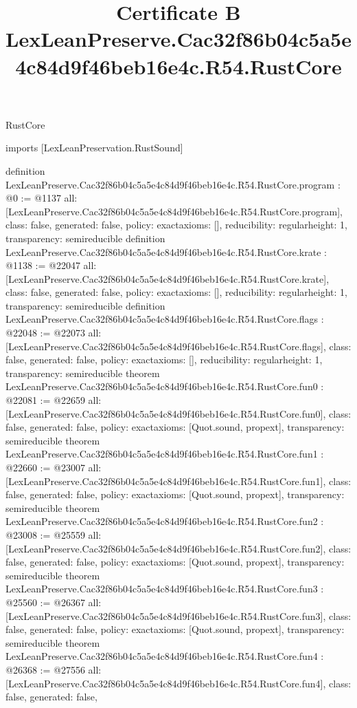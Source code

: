 \begin{lexlean}{RustCore}
\title{Certificate B LexLeanPreserve.Cac32f86b04c5a5e4c84d9f46beb16e4c.R54.RustCore}
\begin{coremodule}
imports [LexLeanPreservation.RustSound]

definition LexLeanPreserve.Cac32f86b04c5a5e4c84d9f46beb16e4c.R54.RustCore.program : @0 := @1137 {
  all: [LexLeanPreserve.Cac32f86b04c5a5e4c84d9f46beb16e4c.R54.RustCore.program],
  class: false,
  generated: false,
  policy: exact{axioms: []},
  reducibility: regular{height: 1},
  transparency: semireducible
}
definition LexLeanPreserve.Cac32f86b04c5a5e4c84d9f46beb16e4c.R54.RustCore.krate : @1138 := @22047 {
  all: [LexLeanPreserve.Cac32f86b04c5a5e4c84d9f46beb16e4c.R54.RustCore.krate],
  class: false,
  generated: false,
  policy: exact{axioms: []},
  reducibility: regular{height: 1},
  transparency: semireducible
}
definition LexLeanPreserve.Cac32f86b04c5a5e4c84d9f46beb16e4c.R54.RustCore.flags : @22048 := @22073 {
  all: [LexLeanPreserve.Cac32f86b04c5a5e4c84d9f46beb16e4c.R54.RustCore.flags],
  class: false,
  generated: false,
  policy: exact{axioms: []},
  reducibility: regular{height: 1},
  transparency: semireducible
}
theorem LexLeanPreserve.Cac32f86b04c5a5e4c84d9f46beb16e4c.R54.RustCore.fun0 : @22081 := @22659 {
  all: [LexLeanPreserve.Cac32f86b04c5a5e4c84d9f46beb16e4c.R54.RustCore.fun0],
  class: false,
  generated: false,
  policy: exact{axioms: [Quot.sound, propext]},
  transparency: semireducible
}
theorem LexLeanPreserve.Cac32f86b04c5a5e4c84d9f46beb16e4c.R54.RustCore.fun1 : @22660 := @23007 {
  all: [LexLeanPreserve.Cac32f86b04c5a5e4c84d9f46beb16e4c.R54.RustCore.fun1],
  class: false,
  generated: false,
  policy: exact{axioms: [Quot.sound, propext]},
  transparency: semireducible
}
theorem LexLeanPreserve.Cac32f86b04c5a5e4c84d9f46beb16e4c.R54.RustCore.fun2 : @23008 := @25559 {
  all: [LexLeanPreserve.Cac32f86b04c5a5e4c84d9f46beb16e4c.R54.RustCore.fun2],
  class: false,
  generated: false,
  policy: exact{axioms: [Quot.sound, propext]},
  transparency: semireducible
}
theorem LexLeanPreserve.Cac32f86b04c5a5e4c84d9f46beb16e4c.R54.RustCore.fun3 : @25560 := @26367 {
  all: [LexLeanPreserve.Cac32f86b04c5a5e4c84d9f46beb16e4c.R54.RustCore.fun3],
  class: false,
  generated: false,
  policy: exact{axioms: [Quot.sound, propext]},
  transparency: semireducible
}
theorem LexLeanPreserve.Cac32f86b04c5a5e4c84d9f46beb16e4c.R54.RustCore.fun4 : @26368 := @27556 {
  all: [LexLeanPreserve.Cac32f86b04c5a5e4c84d9f46beb16e4c.R54.RustCore.fun4],
  class: false,
  generated: false,
}
\end{coremodule}
\end{lexlean}
